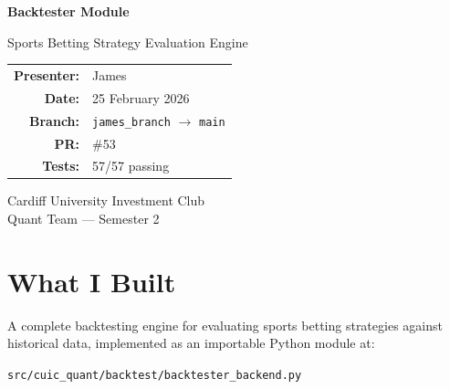 \documentclass[11pt,a4paper]{article}
\begin{document}
\begin{titlepage}
\centering
\vspace*{3cm}

{\Huge\bfseries\color{cuicblue} Backtester Module\par}
\vspace{0.5cm}
{\Large Sports Betting Strategy Evaluation Engine\par}
\vspace{2cm}

{\large
\begin{tabular}{rl}
\textbf{Presenter:} & James \\
\textbf{Date:} & 25 February 2026 \\
\textbf{Branch:} & \texttt{james\_branch} $\rightarrow$ \texttt{main} \\
\textbf{PR:} & \#53 \\
\textbf{Tests:} & 57/57 passing \\
\end{tabular}
\par}

\vspace{2cm}

{\large Cardiff University Investment Club\\Quant Team --- Semester 2\par}

\vfill
\end{titlepage}

\tableofcontents
\newpage

\section{What I Built}

A complete backtesting engine for evaluating sports betting strategies against historical data, implemented as an importable Python module at:

\begin{center}
\texttt{src/cuic\_quant/backtest/backtester\_backend.py}
\end{center}
\end{document}
